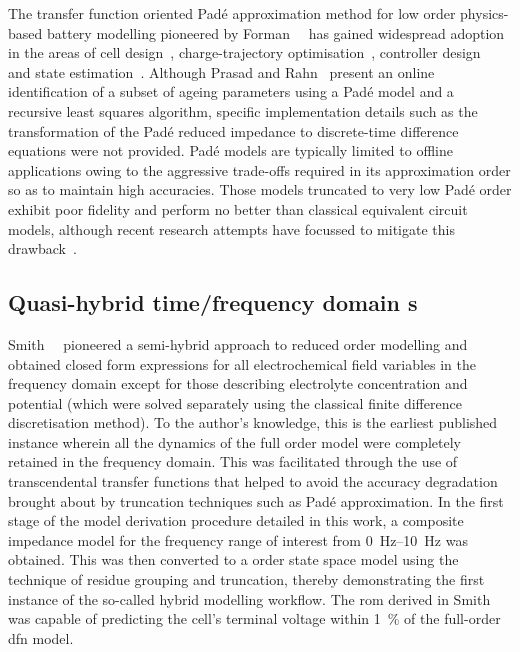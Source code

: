 The     transfer     function     oriented    Padé     approximation     method
for    low    order    physics-based     battery    modelling    pioneered    by
Forman~\etal{}~\cite{Forman2011a}    has   gained    widespread   adoption    in
the    areas     of    cell     design~\cite{Marcicki2013},    charge-trajectory
optimisation~\cite{Bashash2010},    controller    design~\cite{Perez2015}    and
state    estimation~\cite{Marcicki2013,Moura2012}.     Although    Prasad    and
Rahn~\cite{Prasad2013} present  an online identification  of a subset  of ageing
parameters  using  a  Padé  model  and a  recursive  least  squares  algorithm,
specific  implementation  details  such  as  the  transformation  of  the  Padé
reduced  impedance  to discrete-time  difference  equations  were not  provided.
Padé  models  are  typically  limited  to offline  applications  owing  to  the
aggressive  trade-offs required  in its  approximation order  so as  to maintain
high  accuracies.  Those  models  truncated  to very  low  Padé  order  exhibit
poor  fidelity  and   perform  no  better  than   classical  equivalent  circuit
models,  although  recent  research  attempts have  focussed  to  mitigate  this
drawback~\cite{Yuan2017a,Yuan2017}.


\subsection{Quasi-hybrid time/frequency domain s}

Smith~\etal{}~\cite{Smith2007} pioneered a semi-hybrid approach to reduced order
modelling and  obtained closed  form expressions  for all  electrochemical field
variables  in  the frequency  domain  except  for those  describing  electrolyte
concentration and  potential (which were  solved separately using  the classical
finite  difference  discretisation  method).  To the  author's  knowledge,  this
is  the  earliest published  instance  wherein  all  the  dynamics of  the  full
order  model  were  completely  retained  in  the  frequency  domain.  This  was
facilitated through  the use  of transcendental  transfer functions  that helped
to  avoid  the  accuracy  degradation brought  about  by  truncation  techniques
such  as  Padé approximation.  In  the  first  stage  of the  model  derivation
procedure  detailed  in   this  work,  a  composite  impedance   model  for  the
frequency range of interest from  \SIrange{0}{10}{\hertz} was obtained. This was
then  converted  to  a    order state  space  model  using  the
technique of  residue grouping and  truncation, thereby demonstrating  the first
instance of  the so-called hybrid  modelling workflow. The \gls{rom}  derived in
Smith~\etal{}~\cite{Smith2007}  was capable  of predicting  the cell's  terminal
voltage within \SI{1}{\percent} of the full-order \gls{dfn} model.

